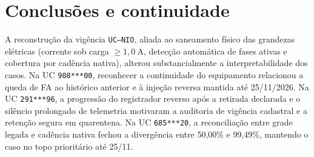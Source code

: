 \section{Conclusões e continuidade}
A reconstrução da vigência \texttt{UC--NIO}, aliada ao saneamento físico das grandezas elétricas (corrente sob carga $\ge 1{,}0\ \mathrm{A}$, detecção automática de fases ativas e cobertura por cadência nativa), alterou substancialmente a interpretabilidade dos casos. Na UC \texttt{908***00}, reconhecer a continuidade do equipamento relacionou a queda de FA ao histórico anterior e à injeção reversa mantida até 25/11/2026. Na UC \texttt{291***96}, a progressão do registrador reverso após a retirada declarada e o silêncio prolongado de telemetria motivaram a auditoria de vigência cadastral e a retenção segura em quarentena. Na UC \texttt{685***20}, a reconciliação entre grade legada e cadência nativa fechou a divergência entre 50,00\% e 99,49\%, mantendo o caso no topo prioritário até 25/11.

